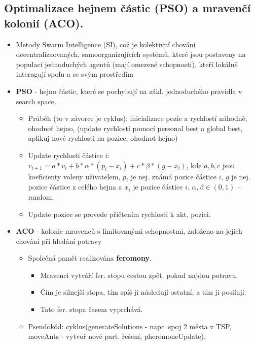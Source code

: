 \documentclass[a4paper,hidelinks]{article}
\begin{document}
\subsection{Optimalizace hejnem částic (PSO) a mravenčí kolonií (ACO).}

\begin{itemize}
    \item Metody Swarm Intelligence (SI), což je kolektivní chování decentralizaovaných, samoorganizujících systémů, které jsou postaveny na populaci jednoduchých agentů (mají omezené schopnosti), kteří lokálně interagují spolu a se svým prostředím
    \item \textbf{PSO} - hejno částic, které se pochybují na zákl. jednoduchého pravidla v search space.
        \begin{itemize}
            \item Průběh (to v závorce je cyklus): inicializace pozic a rychlostí náhodně, ohodnoť hejno, (update rychlostí pomocí personal best a global best, aplikuj nové rychlosti na pozice, ohodnoť hejno)
            \item Update rychlosti částice $i$: $v_{i+1}=a*v_i+b*\alpha*(p_i-x_i)+c*\beta*(g-x_i)$, kde $a,b,c$ jsou koeficienty voleny uživatelem, $p_i$ je nej. známá pozice částice $i$, $g$ je nej. pozice částice z celého hejna a $x_i$ je pozice částice $i$. $\alpha, \beta \in (0,1)$ -- random.
            \item Update pozice se provede přičtením rychlosti k akt. pozici.
        \end{itemize}
    \item \textbf{ACO} - kolonie mravenců s limitovanými schopnostmi, založeno na jejich chování při hledání potravy
        \begin{itemize}
            \item Společná pamět realizována \textbf{feromony}.
                \begin{itemize}
                    \item Mravenci vytváří fer. stopu cestou zpět, pokud najdou potravu.
                    \item Čím je silnejší stopa, tím spíš ji následují ostatní, a tím ji posilují.
                    \item Tato fer. stopa časem vyprchává.
                \end{itemize}
            \item Pseudokód: cyklus(generateSolutions - napr. spoj 2 města v TSP, moveAnts - vytvoř nové part. řešení, pheromoneUpdate).

\end{itemize}
\end{itemize}
\end{document}

